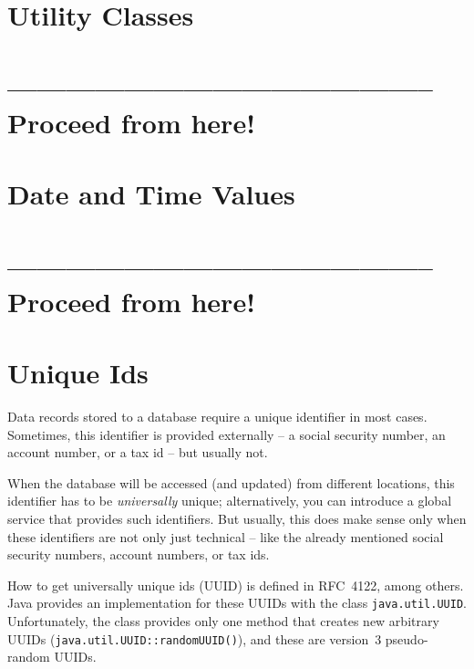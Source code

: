 \section{Utility Classes}\label{sec:UtilityClasses}
\section{-------------------------------------------- Proceed from here!}
\lipsum[5]



\section{Date and Time Values}\label{sec:DateAndTimeValues}
\section{-------------------------------------------- Proceed from here!}
\lipsum[1]


\section{Unique Ids}\label{sec:UniqueIds}
Data records stored to a database require a unique identifier in most cases. Sometimes, this identifier is provided externally – a social security number, an account number, or a tax id – but usually not. 

When the database will be accessed (and updated) from different locations, this identifier has to be \textit{universally} unique; alternatively, you can introduce a global service that provides such identifiers. But usually, this does make sense only when these identifiers are not only just technical – like the already mentioned social security numbers, account numbers, or tax ids.

How to get universally unique ids (UUID) is defined in RFC~4122\autocite{Leach:RFC4122}, among others. Java provides an implementation for these UUIDs with the class \lstinline|java.util.UUID|\autocite{ORACLE_DOC_UUID_CLASS}. Unfortunately, the class provides only one method that creates new arbitrary UUIDs (\lstinline|java.util.UUID::randomUUID()|\autocite{ORACLE_DOC_UUID:randomUUID}), and these are version~3 pseudo-random UUIDs.

